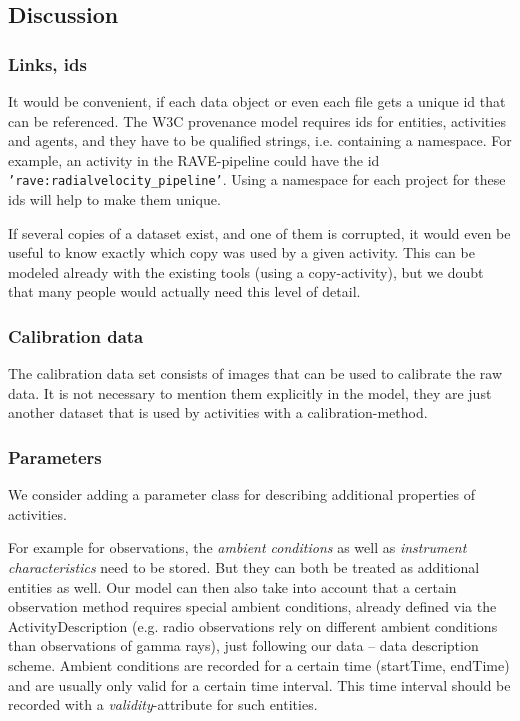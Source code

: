 \subsection{Discussion}


\subsubsection{Links, ids}\label{sec:links_between_data}
It would be convenient, if each data object or even each file 
gets a unique id that can be referenced. The W3C provenance model requires ids
for entities, activities and agents, and they have to be qualified strings, 
i.e. containing a namespace. For example, an activity in the RAVE-pipeline could 
have the id \texttt{'rave:radialvelocity\_pipeline'}. Using a namespace for each 
project for these ids will help to make them unique. 

If several copies of a dataset exist, and one of them is corrupted, it would even be useful to know
exactly which copy was used by a given activity. This can be modeled already 
with the existing tools (using a copy-activity), but we doubt that many people
would actually need this level of detail.



\subsubsection{Calibration data}
The calibration data set consists of images that can be used to calibrate the
raw data. It is not necessary to mention them explicitly in the model, 
they are just another dataset that is used by activities with a 
calibration-method.


\subsubsection{Parameters}
We consider adding a parameter class for describing additional properties of activities.

For example for observations, the \emph{ambient conditions} as well as 
\emph{instrument characteristics} need to be stored. But they can both be treated
as additional entities as well. 
Our model can then also take into account that a certain observation
method requires special ambient conditions, already defined via the 
ActivityDescription (e.g. radio observations rely on different ambient 
conditions than observations
of gamma rays), just following our data -- data description scheme.
Ambient conditions are recorded for a certain time (startTime, endTime) and are
usually only valid for a certain time interval. This time interval should be recorded
with a \emph{validity}-attribute for such entities.

